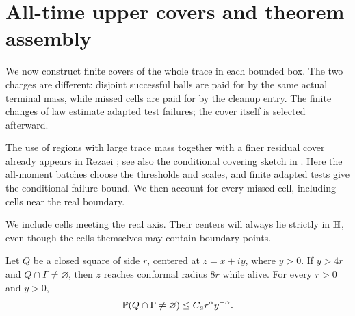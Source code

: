 \section{All-time upper covers and theorem assembly}
\label{hd:cover-section}

We now construct finite covers of the whole trace in each bounded box.
The two charges are different: disjoint successful balls are paid for
by the same actual terminal mass, while missed cells are paid for by
the cleanup entry. The finite changes of law estimate adapted test
failures; the cover itself is selected afterward.

The use of regions with large trace mass together with a finer residual
cover already appears in Rezaei
\cite[Section~3, equations~(9)--(11)]{Rezaei2018}; see also the
conditional covering sketch in
\cite[Remark~4.5]{Zhan2019Optimal}.
Here the all-moment batches choose the thresholds and scales, and finite
adapted tests give the conditional failure bound. We then account for
every missed cell, including cells near the real boundary.

We include cells meeting the real axis. Their centers will always
lie strictly in \(\mathbb H\), even though the cells themselves may
contain boundary points.

\begin{lemma}
\label{hd:visit}
Let \(Q\) be a closed square of side \(r\), centered at
\(z=x+iy\), where \(y>0\).
If \(y>4r\) and \(Q\cap\Gamma\ne\varnothing\), then \(z\)
reaches conformal radius \(8r\) while alive.
For every \(r>0\) and \(y>0\),
\begin{equation}
 \mathbb P(Q\cap\Gamma\ne\varnothing)
 \le C_a r^\alpha y^{-\alpha}.
 \label{hd:one-cell}
\end{equation}
\end{lemma}

